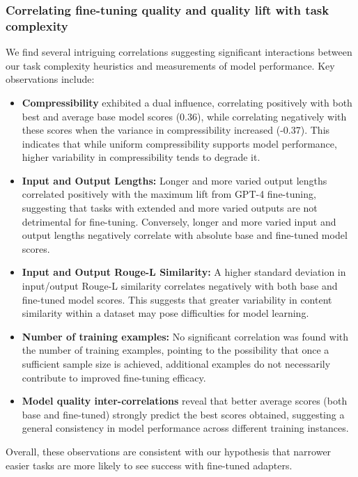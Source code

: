 \subsubsection{Correlating fine-tuning quality and quality lift with task complexity}

We find several intriguing correlations suggesting significant interactions between our task complexity heuristics and measurements of model performance. Key observations include:

\begin{itemize}

\item \textbf{Compressibility} exhibited a dual influence, correlating positively with both best and average base model scores (0.36), while correlating negatively with these scores when the variance in compressibility increased (-0.37). This indicates that while uniform compressibility supports model performance, higher variability in compressibility tends to degrade it.
\item \textbf{Input and Output Lengths:} Longer and more varied output lengths correlated positively with the maximum lift from GPT-4 fine-tuning, suggesting that tasks with extended and more varied outputs are not detrimental for fine-tuning. Conversely, longer and more varied input and output lengths negatively correlate with absolute base and fine-tuned model scores.
\item \textbf{Input and Output Rouge-L Similarity:} A higher standard deviation in input/output Rouge-L similarity correlates negatively with both base and fine-tuned model scores. This suggests that greater variability in content similarity within a dataset may pose difficulties for model learning.
\item \textbf{Number of training examples:} No significant correlation was found with the number of training examples, pointing to the possibility that once a sufficient sample size is achieved, additional examples do not necessarily contribute to improved fine-tuning efficacy.
\item \textbf{Model quality inter-correlations} reveal that better average scores (both base and fine-tuned) strongly predict the best scores obtained, suggesting a general consistency in model performance across different training instances.

\end{itemize}

Overall, these observations are consistent with our hypothesis that narrower easier tasks are more likely to see success with fine-tuned adapters.


